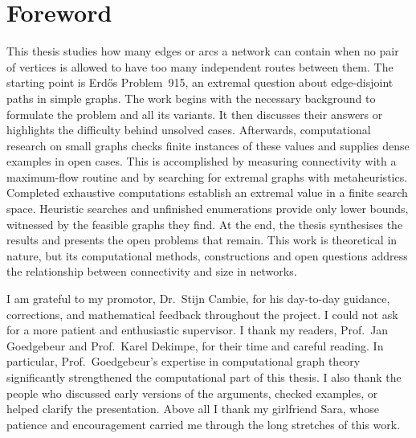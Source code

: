 




\hypersetup{pageanchor=false}
\makefacultycover
\makecopyrightpage
\hypersetup{pageanchor=true}

\setcounter{page}{1}


\chapter*{Foreword}
This thesis studies how many edges or arcs a network can contain when no pair of vertices is allowed to have too many independent routes between them.
The starting point is Erd\H{o}s Problem~915, an extremal question about edge-disjoint paths in simple graphs. 
The work begins with the necessary background to formulate the problem and all its variants. 
It then discusses their answers or highlights the difficulty behind unsolved cases. 
Afterwards, computational research on small graphs checks finite instances of these values and supplies dense examples in open cases.
This is accomplished by measuring connectivity with a maximum-flow routine and by searching for extremal graphs with metaheuristics.
Completed exhaustive computations establish an extremal value in a finite search space. Heuristic searches and unfinished enumerations provide only lower bounds, witnessed by the feasible graphs they find.
At the end, the thesis synthesises the results and presents the open problems that remain.
This work is theoretical in nature, but its computational methods, constructions and open questions address the relationship between connectivity and size in networks.

I am grateful to my promotor, Dr.\ Stijn Cambie, for his day-to-day guidance, corrections, and mathematical feedback throughout the project.
I could not ask for a more patient and enthusiastic supervisor.
I thank my readers, Prof.\ Jan Goedgebeur and Prof.\ Karel Dekimpe, for their time and careful reading.
In particular, Prof.\ Goedgebeur's expertise in computational graph theory significantly strengthened the computational part of this thesis.
I also thank the people who discussed early versions of the arguments, checked examples, or helped clarify the presentation. 
Above all I thank my girlfriend Sara, whose patience and encouragement carried me through the long stretches of this work.

